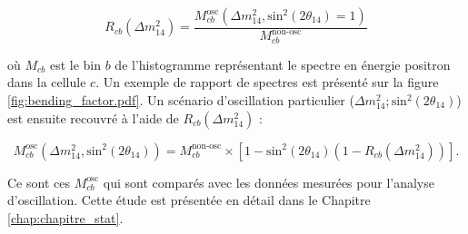 \begin{equation}
R_{cb}(\Delta m_{14}^2) = \frac{M_{cb}^\textrm{osc} \left(\Delta m_{14}^2, \textrm{sin}^2(2\theta_{14}) = 1\right)}{M_{cb}^\textrm{non-osc}}
\end{equation}

\bigbreak

où $M_{cb}$ est le bin $b$ de l'histogramme représentant le spectre en énergie positron dans la cellule $c$. Un exemple de rapport de spectres est présenté sur la figure \ref{fig:bending_factor.pdf}. Un scénario d'oscillation particulier ($\Delta m_{14}^2; \textrm{sin}^2(2\theta_{14})$) est ensuite recouvré à l'aide de $R_{cb}(\Delta m_{14}^2)$ :

\begin{equation}
    M_{cb}^\textrm{osc} \left(\Delta m_{14}^2, \textrm{sin}^2(2\theta_{14})\right) = M_{cb}^\textrm{non-osc} \times \left[1 - \textrm{sin}^2(2\theta_{14}) \left( 1 - R_{cb}(\Delta m_{14}^2) \right)\right].
\end{equation}

\bigbreak

Ce sont ces $M_{cb}^\textrm{osc}$ qui sont comparés avec les données mesurées pour l'analyse d'oscillation. Cette étude est présentée en détail dans le Chapitre \ref{chap:chapitre_stat}.

